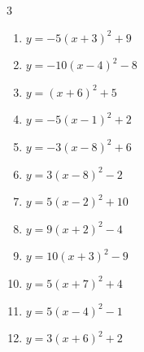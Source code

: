 \begin{multicols}{3}
\begin{enumerate}
  \item $\displaystyle y=-5\left( x+3\right)^{2}+9$

        \phantom{$\displaystyle 頂点\left( -3 , 9 \right)$}

  \item $\displaystyle y=-10\left( x-4\right)^{2}-8$

        \phantom{$\displaystyle 頂点\left( 4 , -8 \right)$}

  \item $\displaystyle y=\left( x+6\right)^{2}+5$

        \phantom{$\displaystyle 頂点\left( -6 , 5 \right)$}

  \item $\displaystyle y=-5\left( x-1\right)^{2}+2$

        \phantom{$\displaystyle 頂点\left( 1 , 2 \right)$}

  \item $\displaystyle y=-3\left( x-8\right)^{2}+6$

        \phantom{$\displaystyle 頂点\left( 8 , 6 \right)$}

  \item $\displaystyle y=3\left( x-8\right)^{2}-2$

        \phantom{$\displaystyle 頂点\left( 8 , -2 \right)$}

  \item $\displaystyle y=5\left( x-2\right)^{2}+10$

        \phantom{$\displaystyle 頂点\left( 2 , 10 \right)$}

  \item $\displaystyle y=9\left( x+2\right)^{2}-4$

        \phantom{$\displaystyle 頂点\left( -2 , -4 \right)$}

  \item $\displaystyle y=10\left( x+3\right)^{2}-9$

        \phantom{$\displaystyle 頂点\left( -3 , -9 \right)$}

  \item $\displaystyle y=5\left( x+7\right)^{2}+4$

        \phantom{$\displaystyle 頂点\left( -7 , 4 \right)$}

  \item $\displaystyle y=5\left( x-4\right)^{2}-1$

        \phantom{$\displaystyle 頂点\left( 4 , -1 \right)$}

  \item $\displaystyle y=3\left( x+6\right)^{2}+2$


\end{enumerate}
\end{multicols}
